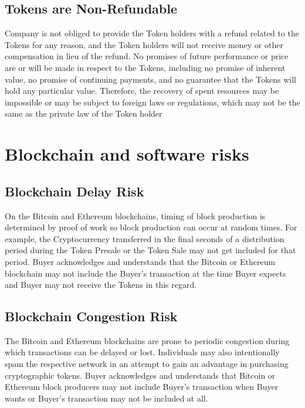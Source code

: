 \documentclass[12pt]{report}
\begin{document}
\subsection*{Tokens are Non-Refundable}
\label{risks-value-non-refundable}
Company is not obliged to provide the Token holders with a refund related to the Tokens for any reason, and the Token holders will not receive money or other compensation in lieu of the refund. No promises of future performance or price are or will be made in respect to the Tokens, including no promise of inherent value, no promise of continuing payments, and no guarantee that the Tokens will hold any particular value. Therefore, the recovery of spent resources may be impossible or may be subject to foreign laws or regulations, which may not be the same as the private law of the Token holder

\section{Blockchain and software risks}
\label{risks-block}

\subsection*{Blockchain Delay Risk}
\label{risks-block-delay}
On the Bitcoin and Ethereum blockchains, timing of block production is determined by proof of work so block production can occur at random times. For example, the Cryptocurrency transferred in the final seconds of a distribution period during the Token Presale or the Token Sale may not get included for that period. Buyer acknowledges and understands that the Bitcoin or Ethereum blockchain may not include the Buyer’s transaction at the time Buyer expects and Buyer may not receive the Tokens in this regard.

\subsection*{Blockchain Congestion Risk}
\label{risks-block-congestion}
The Bitcoin and Ethereum blockchains are prone to periodic congestion during which transactions can be delayed or lost. Individuals may also intentionally spam the respective network in an attempt to gain an advantage in purchasing cryptographic tokens. Buyer acknowledges and understands that Bitcoin or Ethereum block producers may not include Buyer’s transaction when Buyer wants or Buyer’s transaction may not be included at all.
\end{document}
